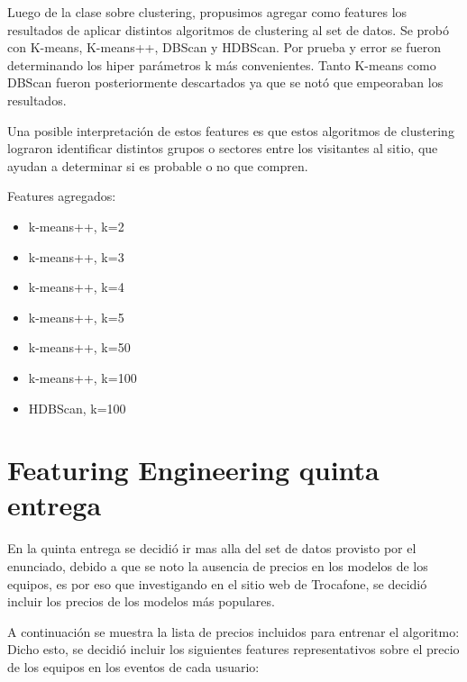 \documentclass[a4paper ,12pt]{article}
\begin{document}
Luego de la clase sobre clustering, propusimos agregar como features los resultados de aplicar distintos algoritmos de clustering al set de datos. Se probó con K-means, K-means++, DBScan y HDBScan. Por prueba y error se fueron determinando los hiper parámetros k más convenientes. Tanto K-means como DBScan fueron posteriormente descartados ya que se notó que empeoraban los resultados.

Una posible interpretación de estos features es que estos algoritmos de clustering lograron identificar distintos grupos o sectores entre los visitantes al sitio, que ayudan a determinar si es probable o no que compren.

Features agregados:
\begin{itemize}
	\item k-means++, k=2
	\item k-means++, k=3
	\item k-means++, k=4
	\item k-means++, k=5
	\item k-means++, k=50
	\item k-means++, k=100
	\item HDBScan, k=100
\end{itemize}

\newpage
\section{Featuring Engineering quinta entrega}

En la quinta entrega se decidió ir mas alla del set de datos provisto por el enunciado, debido a que se noto la ausencia de precios en 
los modelos de los equipos, es por eso que investigando en el sitio web de Trocafone, se decidió incluir los precios de los modelos más populares.

A continuación se muestra la lista de precios incluidos para entrenar el algoritmo:
Dicho esto, se decidió incluir los siguientes features representativos sobre el precio de los equipos en los eventos de cada usuario:
\end{document}
